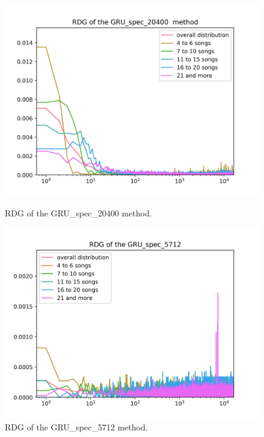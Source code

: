 \begin{figure}[h]
\centering
\begin{minipage}{.45\textwidth}
  \centering
  \includegraphics[width=1\linewidth]{./img/gru_spec_20400_graph.png}
  \caption{RDG of the GRU\_spec\_20400 method.}
  \label{fig:gru_spec_20400_distribution}
\end{minipage}
 \vspace{1cm}
\begin{minipage}{.45\textwidth}
  \centering
  \includegraphics[width=1\linewidth]{./img/gru_spec_5712_graph.png}
  \caption{RDG of the GRU\_spec\_5712 method.}
  \label{fig:gru_spec_5712_distribution}
\end{minipage}
\end{figure}\label{fig:gru_spec_distributions}

